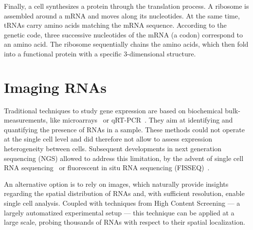 Finally, a cell synthesizes a protein through the translation process.
A ribosome is assembled around a \ac{mRNA} and moves along its nucleotides.
At the same time, \ac{tRNA}s carry amino acids matching the \ac{mRNA} sequence.
According to the genetic code, three successive nucleotides of the \ac{mRNA} (a codon) correspond to an amino acid.
The ribosome sequentially chains the amino acids, which then fold into a functional protein with a specific 3-dimensional structure.

\section{Imaging RNAs}
\label{sec:fish}

Traditional techniques to study gene expression are based on biochemical bulk-measurements, like microarrays~\cite{Schena_1995} or qRT-PCR~\cite{bustin_absolute_2000}. They aim at identifying and quantifying the presence of \ac{RNA}s in a sample. These methods could not operate at the single cell level and did therefore not allow to assess expression heterogeneity between cells. Subsequent developments in next generation sequencing (NGS) allowed to address this limitation, by the advent
of single cell \ac{RNA} sequencing~\cite{Hedlund_2018} or fluorescent in situ \ac{RNA} sequencing (FISSEQ)~\cite{Church_2014}.

An alternative option is to rely on images, which naturally provide insights regarding the spatial distribution of \ac{RNA}s and, with sufficient resolution, enable single cell analysis. Coupled with techniques from High Content Screening --- a largely automatized experimental setup --- this technique can be applied at a large scale, probing thousands of \ac{RNA}s with respect to their spatial localization. 

